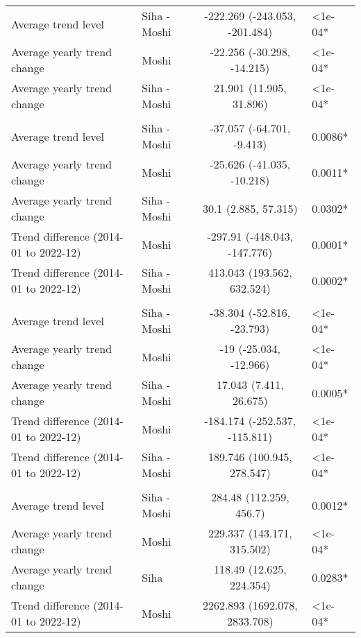 \begin{longtable}{l|lcl}
\midrule\addlinespace[2.5pt]
\multicolumn{4}{l}{Neurological} \\[2.5pt] 
\midrule\addlinespace[2.5pt]
Average trend level & Siha - Moshi & -222.269 (-243.053, -201.484) & <1e-04* \\ 
Average yearly trend change & Moshi & -22.256 (-30.298, -14.215) & <1e-04* \\ 
Average yearly trend change & Siha - Moshi & 21.901 (11.905, 31.896) & <1e-04* \\ 
\midrule\addlinespace[2.5pt]
\multicolumn{4}{l}{Other Non-Communicable} \\[2.5pt] 
\midrule\addlinespace[2.5pt]
Average trend level & Siha - Moshi & -37.057 (-64.701, -9.413) & 0.0086* \\ 
Average yearly trend change & Moshi & -25.626 (-41.035, -10.218) & 0.0011* \\ 
Average yearly trend change & Siha - Moshi & 30.1 (2.885, 57.315) & 0.0302* \\ 
Trend difference (2014-01 to 2022-12) & Moshi & -297.91 (-448.043, -147.776) & 0.0001* \\ 
Trend difference (2014-01 to 2022-12) & Siha - Moshi & 413.043 (193.562, 632.524) & 0.0002* \\ 
\midrule\addlinespace[2.5pt]
\multicolumn{4}{l}{Respiratory Diseases} \\[2.5pt] 
\midrule\addlinespace[2.5pt]
Average trend level & Siha - Moshi & -38.304 (-52.816, -23.793) & <1e-04* \\ 
Average yearly trend change & Moshi & -19 (-25.034, -12.966) & <1e-04* \\ 
Average yearly trend change & Siha - Moshi & 17.043 (7.411, 26.675) & 0.0005* \\ 
Trend difference (2014-01 to 2022-12) & Moshi & -184.174 (-252.537, -115.811) & <1e-04* \\ 
Trend difference (2014-01 to 2022-12) & Siha - Moshi & 189.746 (100.945, 278.547) & <1e-04* \\ 
\midrule\addlinespace[2.5pt]
\multicolumn{4}{l}{Respiratory Infections} \\[2.5pt] 
\midrule\addlinespace[2.5pt]
Average trend level & Siha - Moshi & 284.48 (112.259, 456.7) & 0.0012* \\ 
Average yearly trend change & Moshi & 229.337 (143.171, 315.502) & <1e-04* \\ 
Average yearly trend change & Siha & 118.49 (12.625, 224.354) & 0.0283* \\ 
Trend difference (2014-01 to 2022-12) & Moshi & 2262.893 (1692.078, 2833.708) & <1e-04* \\ 

\end{longtable}
